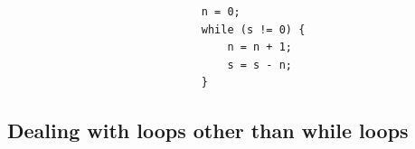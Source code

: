 \small
\begin{verbatim}
                              n = 0;
                              while (s != 0) {
                                  n = n + 1;
                                  s = s - n;
                              }
\end{verbatim}
\normalsize

\subsection{Dealing with loops other than while loops}
\label{sec:other-loops}

